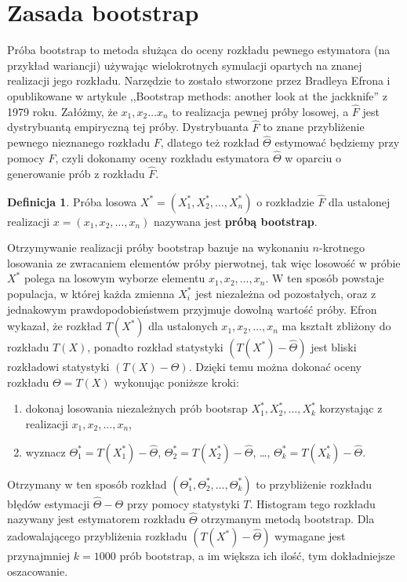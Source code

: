 \documentclass[inzynierska]{pwr_wmat_praca_dyplomowa}
\theoremstyle{plain}
\numberwithin{theorem}{chapter}
\theoremstyle{definition}
\numberwithin{theorem}{chapter}
\newtheorem{definition}[theorem]{Definicja}
\begin{document}
\section{Zasada bootstrap}
Próba bootstrap to metoda służąca do oceny rozkładu pewnego estymatora (na przykład wariancji)  używając wielokrotnych symulacji opartych na znanej realizacji jego rozkładu. Narzędzie to zostało stworzone przez Bradleya Efrona i opublikowane w artykule ,,Bootstrap methods: another look at the jackknife'' z 1979 roku. \cite{efron1} Załóżmy, że $x_1, x_2 \dots x_n$ to realizacja pewnej próby losowej, a $\hat{F}$ jest dystrybuantą empiryczną tej próby. Dystrybuanta $\hat{F}$ to znane przybliżenie pewnego nieznanego rozkładu $F$, dlatego też rozkład $\hat{\Theta}$ estymować będziemy przy pomocy $\hat{F}$, czyli dokonamy oceny rozkładu estymatora $\hat{\Theta}$ w oparciu o generowanie prób z rozkładu $\hat{F}$.  \cite{koronacki}
\begin{definition}
	Próba losowa $X^* = (X_1^*, X_2^*, \dots, X_n^*)$ o rozkładzie $\hat{F}$ dla ustalonej realizacji $x = (x_1, x_2, \dots, x_n)$ nazywana jest \textbf{próbą bootstrap}.
\end{definition}
Otrzymywanie realizacji próby bootstrap bazuje na wykonaniu $n$-krotnego losowania ze zwracaniem elementów próby pierwotnej, tak więc losowość w próbie $X^*$ polega na losowym wyborze elementu $x_1, x_2, \dots, x_n$. W ten sposób powstaje populacja, w której każda zmienna $X_i^*$ jest niezależna od pozostałych, oraz z jednakowym prawdopodobieństwem  przyjmuje dowolną wartość próby. Efron wykazał, że rozkład $T(X^*)$ dla ustalonych $x_1, x_2, \dots, x_n$ ma kształt zbliżony do rozkładu $T(X)$, ponadto rozkład statystyki $(T(X^*)-\hat{\Theta})$ jest bliski rozkładowi statystyki $(T(X)-\Theta)$. Dzięki temu można dokonać oceny rozkładu $\Theta=T(X)$ wykonując poniższe kroki:
\begin{enumerate}
	\item dokonaj losowania niezależnych prób bootsrap $X_1^*, X_2^*, \dots, X_k^*$ korzystając z realizacji $x_1, x_2, \dots, x_n$,
	\item wyznacz $\Theta_1^*=T(X_1^*)-\hat{\Theta}$, $\Theta_2^*=T(X_2^*)-\hat{\Theta}$, \dots, $\Theta_k^*=T(X_k^*)-\hat{\Theta}$.
\end{enumerate}
Otrzymany w ten sposób rozkład $(\Theta_1^*, \Theta_2^*, \dots, \Theta_k^*)$ to przybliżenie rozkładu błędów estymacji $\hat{\Theta}-\Theta$ przy pomocy statystyki $T$. Histogram tego rozkładu nazywany jest estymatorem rozkładu $\hat{\Theta}$ otrzymanym metodą bootstrap. Dla zadowalającego przybliżenia rozkładu $(T(X^*)-\hat{\Theta})$ wymagane jest przynajmniej $k=1000$ prób bootstrap, a im większa ich ilość, tym dokładniejsze oszacowanie.  
\end{document}
